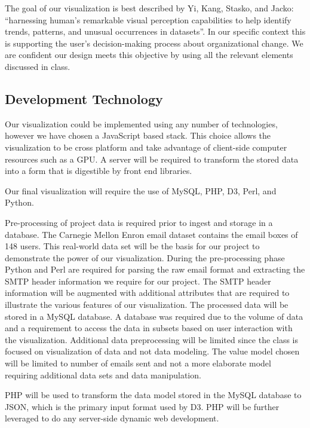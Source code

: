 \documentclass{soups}
\begin{document}
The goal of our visualization is best described by Yi, Kang, Stasko, and Jacko: “harnessing human’s remarkable visual perception capabilities to help identify trends, patterns, and unusual occurrences in datasets”\cite{yi2007toward}.  In our specific context this is supporting the user’s decision-making process about organizational change.  We are confident our design meets this objective by using all the relevant elements discussed in class.

\subsection{Development Technology}
Our visualization could be implemented using any number of technologies, however we have chosen a JavaScript based stack.  This choice allows the visualization to be cross platform and take advantage of client-side computer resources such as a GPU.  A server will be required to transform the stored data into a form that is digestible by front end libraries.

Our final visualization will require the use of MySQL, PHP, D3, Perl, and Python.

Pre-processing of project data is required prior to ingest and storage in a database.  The Carnegie Mellon Enron email dataset\cite{cmuenron} contains the email boxes of 148 users.  This real-world data set will be the basis for our project to demonstrate the power of our visualization.  During the pre-processing phase Python and Perl are required for parsing the raw email format and extracting the SMTP header information we require for our project.  The SMTP header information will be augmented with additional attributes that are required to illustrate the various features of our visualization.  The processed data will be stored in a MySQL database.  A database was required due to the volume of data and a requirement to access the data in subsets based on user interaction with the visualization.  Additional data preprocessing will be limited since the class is focused on visualization of data and not data modeling.  The value model chosen will be limited to number of emails sent and not a more elaborate model requiring additional data sets and data manipulation.   

PHP will be used to transform the data model stored in the MySQL database to JSON, which is the primary input format used by D3.  PHP will be further leveraged to do any server-side dynamic web development.
\end{document}
